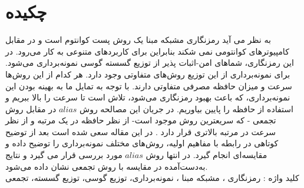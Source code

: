 \chapter*{چکیده}
 به نظر می آید رمزنگاری مشبکه مبنا  یک روش پست کوانتوم است و در مقابل کامپیوترهای کوانتومی نمی شکند  بنابراین برای کاربردهای متنوعی به کار می‌رود. در این رمزنگاری، شماهای امن-اثبات پذیر از توزیع گسسته گوسی نمونه‌برداری می‌شود. برای نمونه‌برداری از این توزیع روش‌های متفاوتی وجود دارد. هر کدام از این روش‌ها سرعت و میزان حافظه مصرفی متفاوتی دارند. با توجه به تمایل ما به بهینه بودن این نمونه‌برداری، که باعث بهبود رمزنگاری می‌شود، تلاش است تا سرعت را بالا ببریم و استفاده از حافظه را پایین بیاوریم. در جریان این مصالحه روش $alias$ در مقابل روش تجمعی - که سریعترین روش موجود است- از نظر حافظه در یک مرتبه و از نظر سرعت در مرتبه بالاتری قرار دارد . در این مقاله سعی شده است بعد از توضیح کوتاهی در رابطه با مفاهیم اولیه، روش‌های مختلف نمونه‌برداری را توضیح داده و مقایسه‌ای انجام گیرد. در انتها روش $alias$ مورد بررسی قرار می گیرد و نتایج به‌دست‌آمده در مقایسه با روش تجمعی نشان داده می‌شود. 
\\
کلید واژه : رمزنگاری ، مشبکه مبنا ، نمونه‌برداری، توزیع گوسی، توزیع گسسته، تجمعی
